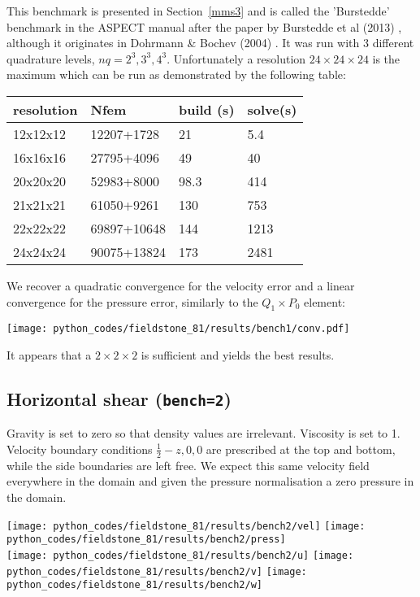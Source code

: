 This benchmark is presented in Section~\ref{mms3} and is called the 'Burstedde' benchmark in the ASPECT manual after 
the paper by Burstedde et al (2013) \cite{busa13}, although it originates in Dohrmann \& Bochev (2004) \cite{dobo04}. 
It was run with 3 different quadrature levels, $nq=2^3,3^3,4^3$. 
Unfortunately a resolution $24\times 24\times 24$ is the maximum which can be run as demonstrated 
by the following table:

\begin{center}
\begin{tabular}{llll}
\hline
resolution &Nfem           &build (s) &solve(s) \\
\hline\hline
12x12x12   &12207+1728     &21        &5.4\\
16x16x16   &27795+4096     &49        &40\\
20x20x20   &52983+8000     &98.3      &414\\
21x21x21   &61050+9261     &130       &753 \\
22x22x22   &69897+10648    &144       &1213\\
24x24x24   &90075+13824    &173       &2481\\
\hline
\end{tabular}
\end{center}
 
 
We recover a quadratic convergence for the velocity error and a linear convergence for the pressure error, 
similarly to the $Q_1\times P_0$ element:

\begin{center}
\texttt{[image: python\_codes/fieldstone\_81/results/bench1/conv.pdf]}
\end{center}

It appears that a $2 \times 2\times 2$ is sufficient and yields the best results.

\subsection*{Horizontal shear ({\tt bench=2})}

Gravity is set to zero so that density values are irrelevant. Viscosity is set to 1.
Velocity boundary conditions $\frac12-z,0,0$ are prescribed at the top and bottom, 
while the side boundaries are left free. We expect this same velocity field everywhere in the 
domain and given the pressure normalisation a zero pressure in the domain. 

\begin{center}
\texttt{[image: python\_codes/fieldstone\_81/results/bench2/vel]}
\texttt{[image: python\_codes/fieldstone\_81/results/bench2/press]}\\
\texttt{[image: python\_codes/fieldstone\_81/results/bench2/u]}
\texttt{[image: python\_codes/fieldstone\_81/results/bench2/v]}
\texttt{[image: python\_codes/fieldstone\_81/results/bench2/w]}
\end{center}



